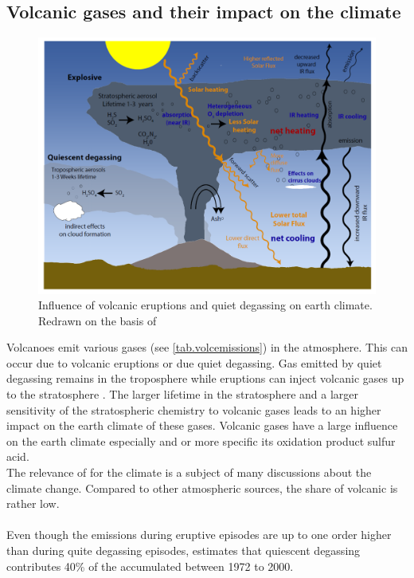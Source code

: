 \documentclass  [
  paper    = a4,
  BCOR     = 10mm,
  twoside,
  fontsize = 12pt,
  fleqn,
  toc      = bibnumbered,
  toc      = listofnumbered,
  numbers  = noendperiod,
  headings = normal,
  listof   = leveldown,
  version  = 3.03
]                                       {scrreprt}
\begin{document}
	\subsection*{Volcanic gases and their impact on the climate}
	\begin{figure}
		\centering
		\includegraphics[width=0.8\linewidth]{Bilder/Simon/Bilder_Tung/Climate_Influence}
		\caption{Influence of volcanic eruptions and quiet degassing on earth climate. Redrawn on the basis of \citet{robock2000volcanic}}
		\label{fig:climateinfluence}
	\end{figure}
	Volcanoes emit various gases (see \cref{tab.volcemissions}) in the atmosphere. This can occur due to volcanic eruptions or due quiet degassing. Gas emitted by quiet degassing remains in the troposphere while eruptions can inject volcanic gases up to the stratosphere \citep{robock2000volcanic}. The larger lifetime in the stratosphere and a larger sensitivity of the stratospheric chemistry to volcanic gases leads to an higher impact on the earth climate of these gases.
	Volcanic gases have a large influence on the earth climate especially  and   or more specific its oxidation product sulfur acid.\\ 
	The relevance of   for the climate is a subject of many discussions about the climate change. Compared to other atmospheric  sources, the share of volcanic   is rather low.\\
	\\
	Even though the  emissions during eruptive episodes are up to one order higher than during quite degassing episodes, \citet{halmer2002annual} estimates that quiescent degassing contributes 40\% of the accumulated  between 1972 to 2000.\\
\end{document}
